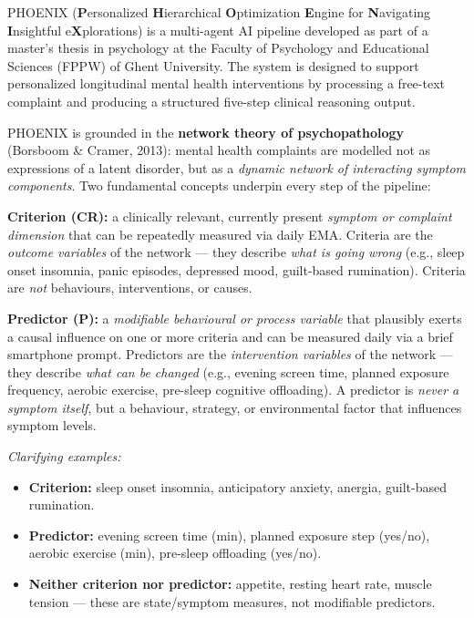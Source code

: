 \documentclass[11pt,a4paper]{article}
\begin{document}
PHOENIX (\textbf{P}ersonalized \textbf{H}ierarchical \textbf{O}ptimization \textbf{E}ngine for \textbf{N}avigating \textbf{I}nsightful e\textbf{X}plorations) is a multi-agent AI pipeline developed as part of a master's thesis in psychology at the Faculty of Psychology and Educational Sciences (FPPW) of Ghent University. The system is designed to support personalized longitudinal mental health interventions by processing a free-text complaint and producing a structured five-step clinical reasoning output.

PHOENIX is grounded in the \textbf{network theory of psychopathology} (Borsboom \& Cramer, 2013): mental health complaints are modelled not as expressions of a latent disorder, but as a \emph{dynamic network of interacting symptom components}. Two fundamental concepts underpin every step of the pipeline:

\begin{instrbox}[title=Key definitions: criterion vs.\ predictor]
\small
\textbf{Criterion (CR):} a clinically relevant, currently present \emph{symptom or complaint dimension} that can be repeatedly measured via daily EMA. Criteria are the \emph{outcome variables} of the network --- they describe \emph{what is going wrong} (e.g., sleep onset insomnia, panic episodes, depressed mood, guilt-based rumination). Criteria are \emph{not} behaviours, interventions, or causes.

\medskip
\textbf{Predictor (P):} a \emph{modifiable behavioural or process variable} that plausibly exerts a causal influence on one or more criteria and can be measured daily via a brief smartphone prompt. Predictors are the \emph{intervention variables} of the network --- they describe \emph{what can be changed} (e.g., evening screen time, planned exposure frequency, aerobic exercise, pre-sleep cognitive offloading). A predictor is \emph{never a symptom itself}, but a behaviour, strategy, or environmental factor that influences symptom levels.

\medskip\small
\textit{Clarifying examples:}
\begin{itemize}[topsep=1pt,itemsep=0pt]
\item \textbf{Criterion:} sleep onset insomnia, anticipatory anxiety, anergia, guilt-based rumination.
\item \textbf{Predictor:} evening screen time (min), planned exposure step (yes/no), aerobic exercise (min), pre-sleep offloading (yes/no).
\item \textbf{Neither criterion nor predictor:} appetite, resting heart rate, muscle tension --- these are state/symptom measures, not modifiable predictors.
\end{itemize}
\end{instrbox}
\end{document}
